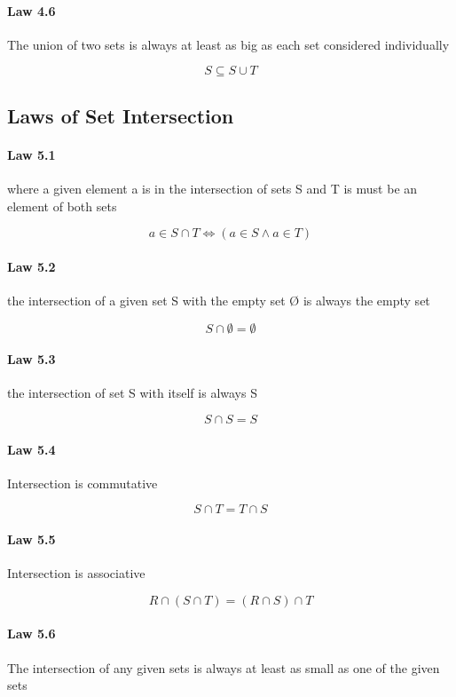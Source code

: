 \documentclass[twocolumn]{article}
\begin{document}
\paragraph{Law 4.6} The union of two sets is always at least as big as each set considered individually

$$ S  \subseteq  S \cup T $$

\subsection{Laws of Set Intersection}

\paragraph{Law 5.1} where a given element a is in the intersection of sets S and T is must be an element of both sets

$$ a  \in  S  \cap  T \iff (a  \in  S \wedge a  \in  T) $$

\paragraph{Law 5.2} the intersection of a given set S with the empty set Ø is always the empty set

$$ S \cap  \emptyset = \emptyset  $$

\paragraph{Law 5.3} the intersection of set S with itself is always S

$$ S \cap S = S $$

\paragraph{Law 5.4} Intersection is commutative

$$ S \cap T=T \cap S $$

\paragraph{Law 5.5} Intersection is associative

$$ R  \cap  (S  \cap  T) = (R  \cap  S)  \cap  T $$

\paragraph{Law 5.6} The intersection of any given sets is always at least as small as one of the given sets
\end{document}
